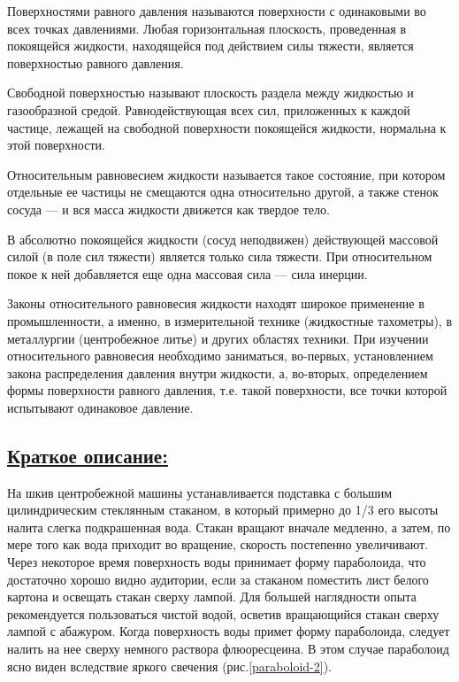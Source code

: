 \documentclass[14pt,a4paper,oneside]{extarticle}	%
\begin{document}
Поверхностями равного давления называются поверхности с одинаковыми во всех точках давлениями.
Любая горизонтальная плоскость, проведенная в покоящейся жидкости, находящейся под действием силы тяжести, является поверхностью равного давления.

Свободной поверхностью называют плоскость раздела между жидкостью и газообразной средой.
Равнодействующая всех сил, приложенных к каждой частице, лежащей на свободной поверхности покоящейся жидкости, нормальна к этой поверхности.

Относительным равновесием жидкости называется такое состояние, при котором отдельные ее частицы не смещаются одна относительно другой, 
а также стенок сосуда — и вся масса жидкости движется как твердое тело.

В абсолютно покоящейся жидкости (сосуд неподвижен) действующей массовой силой (в поле сил тяжести) является только сила тяжести.
При относительном покое к ней добавляется еще одна массовая сила — сила инерции.

Законы относительного равновесия жидкости находят широкое применение в промышленности, а именно, в измерительной технике (жидкостные тахометры), в металлургии (центробежное литье) и других областях техники.
При изучении относительного равновесия необходимо заниматься, во-первых, установлением закона распределения давления внутри жидкости, 
а, во-вторых, определением формы поверхности равного давления, т.е. такой поверхности, все точки которой испытывают одинаковое давление.

\subsection*{\underline{Краткое описание:}}

На шкив центробежной машины устанавливается подставка с большим цилиндрическим стеклянным стаканом, 
в который примерно до 1/3 его высоты налита слегка подкрашенная вода.
Стакан вращают вначале медленно, а затем, по мере того как вода приходит во вращение, скорость постепенно увеличивают. 
Через некоторое время поверхность воды принимает форму параболоида, что достаточно хорошо видно аудитории, если за стаканом поместить лист белого картона и освещать стакан сверху лампой. 
Для большей наглядности опыта рекомендуется пользоваться чистой водой, 
осветив вращающийся стакан сверху лампой с абажуром. 
Когда поверхность воды примет форму параболоида, следует налить на нее сверху немного раствора флюоресцеина. 
В этом случае параболоид ясно виден вследствие яркого свечения (рис.\ref{paraboloid-2}).
\end{document}
